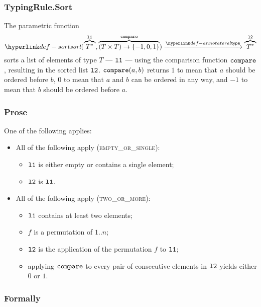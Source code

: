 \subsubsection{TypingRule.Sort\label{sec:sortinglists}}
\hypertarget{def-sort}{}
The parametric function
\[
\sort(\overname{T^*}{\vlone}, \overname{(T\times T)\rightarrow \{-1,0,1\}}{\compare}) \typearrow \overname{T^*}{\vltwo}
\]
sorts a list of elements of type $T$ --- $\texttt{l1}$ --- using the comparison function $\texttt{compare}$,
resulting in the sorted list $\texttt{l2}$.
$\texttt{compare}(a, b)$ returns $1$ to mean that $a$ should be ordered before $b$,
$0$ to mean that $a$ and $b$ can be ordered in any way,
and $-1$ to mean that $b$ should be ordered before $a$.

\subsubsection{Prose}
One of the following applies:
\begin{itemize}
  \item All of the following apply (\textsc{empty\_or\_single}):
  \begin{itemize}
    \item $\texttt{l1}$ is either empty or contains a single element;
    \item $\texttt{l2}$ is $\texttt{l1}$.
  \end{itemize}

  \item All of the following apply (\textsc{two\_or\_more}):
  \begin{itemize}
    \item $\texttt{l1}$ contains at least two elements;
    \item $f$ is a permutation of $1..n$;
    \item $\texttt{l2}$ is the application of the permutation $f$ to $\texttt{l1}$;
    \item applying $\texttt{compare}$ to every pair of consecutive elements in $\texttt{l2}$ yields either $0$ or $1$.
  \end{itemize}
\end{itemize}

\subsubsection{Formally}

